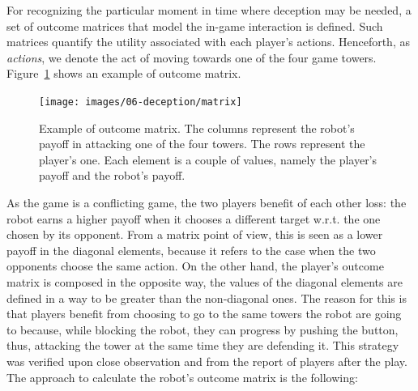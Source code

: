For recognizing the particular moment in time where deception may be needed, a set of outcome matrices that model the in-game interaction is defined. Such matrices quantify the utility associated with each player's actions. Henceforth, as \textit{actions}, we denote the act of moving towards one of the four game towers. Figure~\ref{fig:matrix} shows an example of outcome matrix.

\begin{figure}[h]
    \centering
    \texttt{[image: images/06-deception/matrix]}
    \caption{Example of outcome matrix. The columns represent the  robot's payoff in attacking one of the four towers. The rows represent the player's one. Each element is a couple of values, namely the player's payoff and the robot's payoff.}
    \label{fig:matrix}
\end{figure}

As the game is a conflicting game, the two players benefit of each other loss: the robot earns a higher payoff when it chooses a different target w.r.t. the one chosen by its opponent. From a matrix point of view, this is seen as a lower payoff in the diagonal elements, because it refers to the case when the two opponents choose the same action. On the other hand, the player's outcome matrix is composed in the opposite way, \ie the values of the diagonal elements are defined in a way to be greater than the non-diagonal ones. The reason for this is that players benefit from choosing to go to the same towers the robot are going to because, while blocking the robot, they can progress by pushing the button, thus, attacking the tower at the same time they are defending it. This strategy was verified upon close observation and from the report of players after the play. The approach to calculate the robot's outcome matrix is the following:

